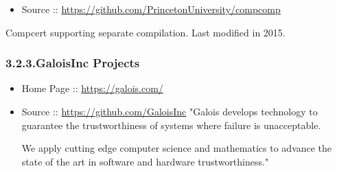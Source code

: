 \documentclass[12pt,twoside]{article}
\begin{document}
\begin{itemize}[noitemsep,topsep=\mdcompacttopsep]%

\item{}Source :: \href{https://github.com/PrincetonUniversity/compcomp}{{\ttfamily https://\hspace{0pt}github.\hspace{0pt}com/\hspace{0pt}PrincetonUniversity/\hspace{0pt}compcomp}}%
\end{itemize}%

\noindent{}Compcert supporting separate compilation. Last modified in 2015.%

\subsubsection{3.2.3.\hspace*{0.5em}GaloisInc Projects}\label{sec-galoisinc-projects}%

\begin{itemize}%

\item{}
Home Page :: \href{https://galois.com/}{{\ttfamily https://\hspace{0pt}galois.\hspace{0pt}com/\hspace{0pt}}}%

\item{}
Source :: \href{https://github.com/GaloisInc}{{\ttfamily https://\hspace{0pt}github.\hspace{0pt}com/\hspace{0pt}GaloisInc}}
  "Galois develops technology to guarantee the trustworthiness of
  systems where failure is unacceptable.%

  We apply cutting edge computer science and mathematics to advance the
  state of the art in software and hardware trustworthiness."%
\end{itemize}%
\end{document}
